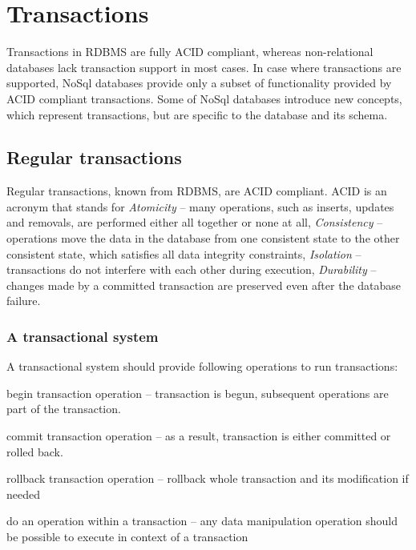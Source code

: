 \section{Transactions}\label{sec:theory:transactions}
Transactions in RDBMS are fully ACID compliant, whereas non-relational databases lack transaction support in most cases. 
In case where transactions are supported, NoSql databases provide only a subset of functionality provided by ACID compliant transactions. 
Some of NoSql databases introduce new concepts, which represent transactions, but are specific to the database and its schema.


\subsection{Regular transactions}
Regular transactions, known from RDBMS, are ACID compliant. ACID is an acronym that stands for \emph{Atomicity} -- many operations, such as inserts, updates and removals, are performed either all together or none at all, \emph{Consistency} -- operations move the data in the database from one consistent state to the other consistent state, which satisfies all data integrity constraints, \emph{Isolation} -- transactions do not interfere with each other during execution, \emph{Durability} -- changes made by a committed transaction are preserved even after the database failure.

\subsubsection{A transactional system}
A transactional system should provide following operations to run transactions:
\begin{enumerate*}
\item begin transaction operation -- transaction is begun, subsequent operations are part of the transaction. 
\item commit transaction operation -- as a result, transaction is either committed or rolled back.
\item rollback transaction operation -- rollback whole transaction and its modification if needed
\item do an operation within a transaction -- any data manipulation operation should be possible to execute in context of a transaction
\end{enumerate*}


